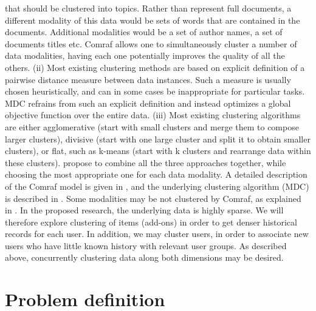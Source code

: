 \documentclass[11pt,oneside]{book}
\begin{document}
that should be clustered into topics. Rather than represent full
documents, a different modality of this data would be sets of words
that are contained in the documents. Additional modalities would be a
set of author names, a set of documents titles etc. Comraf allows one
to simultaneously cluster a number of data modalities, having each one
potentially improves the quality of all the others. (ii) Most existing
clustering methods are based on explicit definition of a pairwise
distance measure between data instances. Such a measure is usually
chosen heuristically, and can in some cases be inappropriate for
particular tasks. MDC refrains from such an explicit definition and
instead optimizes a global objective function over the entire
data. (iii) Most existing clustering algorithms are either
agglomerative (start with small clusters and merge them to compose
larger clusters), divisive (start with one large cluster and split it
to obtain smaller clusters), or flat, such as k-means (start with k
clusters and rearrange data within these clusters). \citep{bekkerman05} propose to combine all the three approaches together, while
choosing the most appropriate one for each data modality. A detailed
description of the Comraf model is given in \citep{bekkerman2006semi}, and
the underlying clustering algorithm (MDC) is described in \citep{bekkerman05}. Some modalities may be not clustered by Comraf, as explained
in \citep{bekkerman2007multi}.  In the proposed research, the underlying
data is highly sparse. We will therefore explore clustering of items
(add-ons) in order to get denser historical records for each user. In
addition, we may cluster users, in order to associate new users who
have little known history with relevant user groups. As described
above, concurrently clustering data along both dimensions may be
desired.

\chapter{Problem definition}
\end{document}
